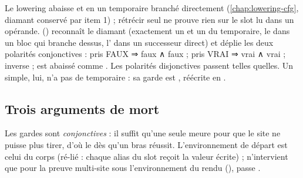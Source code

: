 Le lowering abaisse  et  en un temporaire  branché directement (\cref{chap:lowering-cfg}, diamant conservé par  item 1) ; rétrécir  seul ne prouve rien sur le slot lu dans un opérande.  () reconnaît le diamant (exactement un  et un  du temporaire, le  dans un bloc qui branche dessus, l' dans un successeur direct) et déplie les deux polarités conjonctives :  pris FAUX ⇒  faux ∧  faux ;  pris VRAI ⇒  vrai ∧  vrai ;  inverse ;  est abaissé comme \code{||}. Les polarités disjonctives passent telles quelles. Un  simple, lui, n'a pas de temporaire : sa garde est , réécrite en .

\subsection{Trois arguments de mort}


Les gardes sont \emph{conjonctives} : il suffit qu'une seule meure pour que le site ne puisse plus tirer, d'où le  dès qu'un bras réussit. L'environnement de départ est celui du corps (ré-lié : chaque alias du slot reçoit la valeur écrite) ;  n'intervient que pour la preuve multi-site sous l'environnement du rendu (),  passe .

